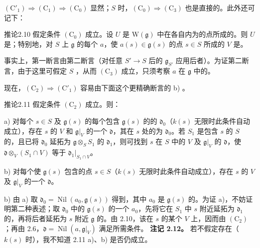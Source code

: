 $(\mathrm C'_1)\Rightarrow(\mathrm C_1)\Rightarrow(\mathrm C_0)$ 显然；$S$ 时，$(\mathrm C_0)\Rightarrow(\mathrm C_3)$ 也是直接的。此外还可记下：
\begin{SGAresult}{推论}{2.10}
假定条件 $(\mathrm C_0)$ 成立。设 $U$ 是 $\mathrm W(\mathfrak g)$ 中在各自内为的点所成的。则 $U$ 是；特别地，对 $S$ 上 $\mathfrak g$ 的每个 $a$，使 $a(s)\in\mathfrak g(s)$ 的点 $s\in S$ 所成的 $V$ 是。
\end{SGAresult}
事实上，第一断言由第二断言（对任意 $S'\to S$ 后的 $\mathfrak g_{S'}$ 应用后者）。为证第二断言，由于这里可假定 $S$ ，从而 $(\mathrm C_3)$ 成立，只须考察 $a$ 在 $\mathfrak g$ 中的。

现在，$(\mathrm C_2)\Rightarrow(\mathrm C'_1)$ 容易由下面这个更精确断言的 b) 。
\begin{SGAresult}{推论}{2.11}
假定条件 $(\mathrm C_2)$ 成立。则：

a) 对每个 $s\in S$ 及 $\mathfrak g(s)$ 的每个包含 $\mathfrak g(s)$ 的的 $\mathfrak d_0$（$k(s)$ 无限时此条件自动成立），存在 $s$ 的 $V$ 和 $\mathfrak g|_V$ 的一个 $\mathfrak d$，其在 $s$ 处的为 $\mathfrak d_0$。若 $S_1$ 是包含 $s$ 的 $S$ 的，且已将 $\mathfrak d_0$ 延拓为 $\mathfrak g\otimes_S S_1$ 的 $\mathfrak d_1$，则可找到 $s$ 在 $S$ 中的 $V$ 及 $\mathfrak g|_V$ 的 $\mathfrak d$，使 $\mathfrak d\otimes_V(S_1\cap V)$ 等于 $\mathfrak d_1|_{S_1\cap V}$。

b) 对每个使 $\mathfrak g(s)$ 包含的点 $s\in S$（$k(s)$ 无限时此条件自动成立），存在 $s$ 的 $V$ 及 $\mathfrak g|_V$ 的一个 $\mathfrak d$。
\end{SGAresult}
b) 由 a) 取 $\mathfrak d_0=\operatorname{Nil}(a_0,\mathfrak g(s))$ 得到，其中 $a_0$ 是 $\mathfrak g(s)$ 的。为证 a)，不妨证明第二种表述；取 $\mathfrak d_0$ 中的 $\mathfrak g(s)$ 的一个 $a_0$，先将它在 $S_1$ 中 $s$ 附近延拓为 $\mathfrak d_1$ 的，再将后者延拓为 $s$ 附近 $\mathfrak g$ 的。由 2.10，该在 $s$ 的某个 $V$ 上，因而由 $(\mathrm C_2)$ ；再由 2.6，$\mathfrak d=\operatorname{Nil}(a,\mathfrak g|_V)$ 满足所需条件。
\textbf{注记 2.12。} 若不假定存在（$k(s)$ 时），我不知道 2.11 a)、b) 是否仍成立。

